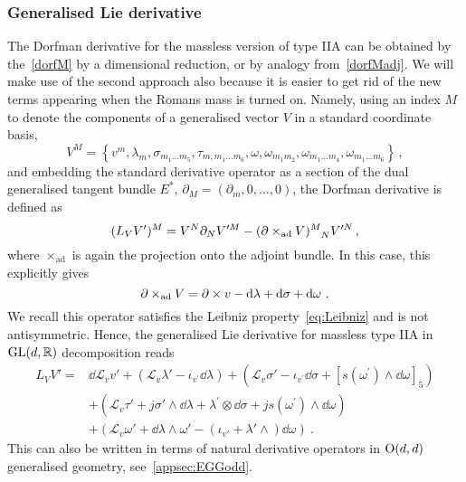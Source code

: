 \documentclass[debug]{phd}
\begin{document}
				\subsubsection{Generalised Lie derivative}
					The Dorfman derivative for the massless version of type IIA can be obtained by the~\eqref{dorfM} by a dimensional reduction, or by analogy from~\eqref{dorfMadj}.
					We will make use of the second approach also because it is easier to get rid of the new terms appearing when the Romans mass is turned on.
					Namely, using an index $M$ to denote the components of a generalised vector $V$ in a standard coordinate basis, 
							\begin{equation}
								V^M = \left\{v^m , \lambda_m, \sigma_{m_1\ldots m_5}, \tau_{m,m_1\ldots m_6} , \omega, \omega_{m_1m_2}, \omega_{m_1\ldots m_4}, \omega_{m_1\ldots m_6}\right\} \, ,
							\end{equation}
					and embedding the standard derivative operator as a section of the dual generalised tangent bundle $E^*$, $\partial_M = (\partial_m, 0, \ldots,0)$, the Dorfman derivative is defined as~\cite{waldram4}
							\begin{equation}\label{eq:Liedefg}
								(L_V V')^M = V^N \partial_N V^{\prime M} - (\partial \times_{\rm ad} V)^M_{\phantom{M}N} V^{\prime N}\, , 
							\end{equation}
					where $ \times_{\mathrm{ad}}$ is again the projection onto the adjoint bundle.
					In this case, this explicitly gives 
							\begin{equation}
								\partial \times_{\mathrm{ad}} V = \partial \times v -\mathrm{d} \lambda + \mathrm{d} \sigma + \mathrm{d} \omega\ .
							\end{equation}
					We recall this operator satisfies the Leibniz property~\eqref{eq:Leibniz} and is not antisymmetric.
					Hence, the generalised Lie derivative for massless type IIA in $\mathrm{GL}(d,\mathbb{R})$ decomposition reads
							\begin{equation}\label{dorfIIA}
								\begin{split}
									L_V V' =&\dd \mathcal{L}_v v' + \left(\mathcal{L}_v \lambda' - \iota_{v^\prime} \dd\lambda \right) + \left( \mathcal{L}_v \sigma' - \iota_{v^\prime}\dd\sigma + [s(\omega^\prime) \wedge \dd\omega]_5\right) \\
											& + \left(\mathcal{L}_v \tau' + j \sigma' \wedge \dd\lambda + \lambda^\prime \otimes \dd\sigma + j s(\omega^\prime) \wedge \dd\omega \right) \\
											& + \left(\mathcal{L}_v \omega' + \dd \lambda \wedge \omega' - (\iota_{v'}+ \lambda' \wedge)\dd\omega\right) \ .
								\end{split}
							\end{equation}
					This can also be written in terms of natural derivative operators in $\mathrm{O}(d,d)$ generalised geometry, see~\cref{appsec:EGGodd}.
					
\end{document}
